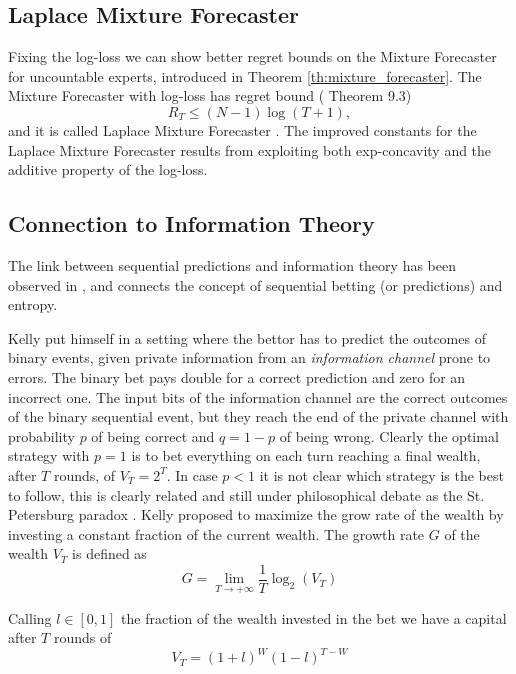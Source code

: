 \subsection{Laplace Mixture Forecaster}\label{sec:laplace_mixture}

Fixing the log-loss we can show better regret bounds on the Mixture Forecaster for uncountable experts, introduced in Theorem \ref{th:mixture_forecaster}. The Mixture Forecaster with log-loss has regret bound (\cite{cesa2006prediction} Theorem 9.3)
\begin{equation}
R_T\le(N-1)\log(T+1),
\end{equation}
and it is called Laplace Mixture Forecaster \cite{weinberger1994optimal}. The improved constants for the Laplace Mixture Forecaster results from exploiting both exp-concavity and the additive property of the log-loss.

\subsection{Connection to Information Theory}\label{sec:Info} 

The link between sequential predictions and information theory has been observed in \cite{kelly2011new}, and connects the concept of sequential betting (or predictions) and entropy.

Kelly put himself in a setting where the bettor has to predict the outcomes of binary events, given private information from an \emph{information channel} prone to errors. The binary bet pays double for a correct prediction and zero for an incorrect one. The input bits of the information channel are the correct outcomes of the binary sequential event, but they reach the end of the private channel with probability $p$ of being correct and $q=1-p$ of being wrong. Clearly the optimal strategy with $p=1$ is to bet everything on each turn reaching a final wealth, after $T$ rounds, of $V_T=2^T$. In case $p<1$ it is not clear which strategy is the best to follow, this is clearly related and still under philosophical debate as the St. Petersburg paradox \cite{samuelson1977st}. Kelly proposed to maximize the grow rate of the wealth by investing a constant fraction of the current wealth. The growth rate $G$ of the wealth $V_T$ is defined as 
$$G=\lim\limits_{T\to+\infty}\frac{1}{T}\log_2(V_T)$$

Calling $l\in[0,1]$ the fraction of the wealth invested in the bet we have a capital after $T$ rounds of 
$$V_T=(1+l)^{W}(1-l)^{T-W}$$ 

